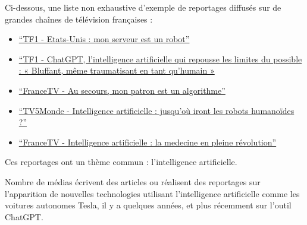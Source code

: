 \documentclass[
12pt,
french,
]{article}
\begin{document}
Ci-dessous, une liste non exhaustive d'exemple de reportages diffusés
sur de grandes chaînes de télévision françaises :

\begin{itemize}
\item
  \href{https://www.tf1info.fr/high-tech/video-reportage-tf1-etats-unis-penurie-de-main-d-oeuvre-dans-les-restaurants-mon-serveur-est-un-robot-2245198.html}{``TF1
  - Etats-Unis : mon serveur est un robot''}
\item
  \href{https://www.tf1info.fr/sciences-et-innovation/interview-chatgpt-intelligence-artificielle-qui-repousse-les-limites-du-possible-bluffant-pour-ne-pas-dire-traumatisant-en-tant-qu-humain-selon-jean-gabriel-ganascia-2244812.html}{``TF1
  - ChatGPT, l'intelligence artificielle qui repousse les limites du
  possible : « Bluffant, même traumatisant en tant qu'humain »}
\item
  \href{\%5BCash\%20Investigation\%20-\%20Au\%20secours,\%20mon\%20patron\%20est\%20un\%20algorithme\%20en\%20streaming\%20-\%20Replay\%20France\%202\%20\%7C\%20France\%20tv\%5D(https://www.france.tv/france-2/cash-investigation/1066737-au-secours-mon-patron-est-un-algorithme.html)}{``FranceTV
  - Au secours, mon patron est un algorithme''}
\item
  \href{\%5BIntelligence\%20artificielle\%20:\%20jusqu\textquotesingle{}où\%20iront\%20les\%20robots\%20humanoïdes\%20?\%20\%7C\%20TV5MONDE\%20-\%20Informations\%5D(https://information.tv5monde.com/video/intelligence-artificielle-jusqu-ou-iront-les-robots-humanoides)}{``TV5Monde
  - Intelligence artificielle : jusqu'où iront les robots humanoïdes
  ?''}
\item
  \href{\%5BIntelligence\%20artificielle\%20:\%20la\%20médecine\%20en\%20pleine\%20révolution\%20-\%20J.-E.\%20Bibault\%20-\%20Extrait\%20C\%20l\textquotesingle{}hebdo\%20en\%20streaming\%20\%7C\%20France\%20tv\%5D(https://www.france.tv/france-5/c-l-hebdo/c-l-hebdo-saison-7/4523950-intelligence-artificielle-la-medecine-en-pleine-revolution-j-e-bibault-c-l-hebdo-14-01-2023.html)}{``FranceTV
  - Intelligence artificielle : la medecine en pleine révolution''}
\end{itemize}

Ces reportages ont un thème commun : l'intelligence artificielle.

Nombre de médias écrivent des articles ou réalisent des reportages sur
l'apparition de nouvelles technologies utilisant l'intelligence
artificielle comme les voitures autonomes Tesla, il y a quelques années,
et plus récemment sur l'outil ChatGPT.
\end{document}
